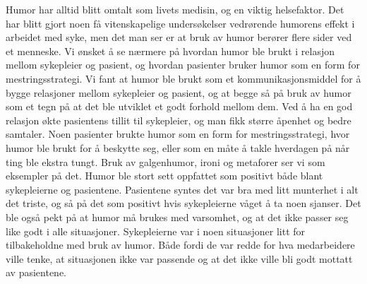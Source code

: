 Humor har alltid blitt omtalt som livets medisin, og en viktig helsefaktor. Det
har blitt gjort noen få vitenskapelige undersøkelser vedrørende humorens effekt
i arbeidet med syke, men det man ser er at bruk av humor berører flere sider
ved et menneske. Vi ønsket å se nærmere på hvordan humor ble brukt i relasjon
mellom sykepleier og pasient, og hvordan pasienter bruker humor som en form for
mestringsstrategi. Vi fant at humor ble brukt som et kommunikasjonsmiddel for å
bygge relasjoner mellom sykepleier og pasient, og at begge så på bruk av humor
som et tegn på at det ble utviklet et godt forhold mellom dem. Ved å ha en god
relasjon økte pasientens tillit til sykepleier, og man fikk større åpenhet og
bedre samtaler. Noen pasienter brukte humor som en form for mestringsstrategi,
hvor humor ble brukt for å beskytte seg, eller som en måte å takle hverdagen på
når ting ble ekstra tungt. Bruk av galgenhumor, ironi og metaforer ser vi som
eksempler på det. Humor ble stort sett oppfattet som positivt både blant
sykepleierne og pasientene. Pasientene syntes det var bra med litt munterhet i
alt det triste, og så på det som positivt hvis sykepleierne våget å ta noen
sjanser. Det ble også pekt på at humor må brukes med varsomhet, og at det ikke
passer seg like godt i alle situasjoner. Sykepleierne var i noen situasjoner
litt for tilbakeholdne med bruk av humor. Både fordi de var redde for hva
medarbeidere ville tenke, at situasjonen ikke var passende og at det ikke ville
bli godt mottatt av pasientene.
